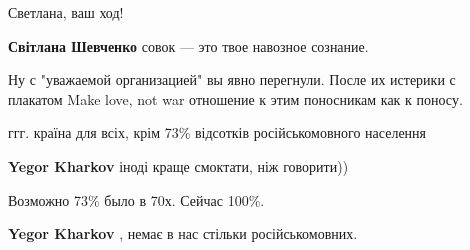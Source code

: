 \begin{itemize}
\begin{itemize}
Светлана, ваш ход!

 
\textbf{Світлана Шевченко} совок — это твое навозное сознание.
\end{itemize}

 
Ну с "уважаемой организацией" вы явно перегнули. После их истерики с плакатом
Make love, not war отношение к этим поносникам как к поносу.

 
ггг. країна для всіх, крім 73\% відсотків російськомовного населення

\begin{itemize}
 
\textbf{Yegor Kharkov} іноді краще смоктати, ніж говорити))

 
Возможно 73\% было в 70х. Сейчас 100\%.

 
\textbf{Yegor Kharkov} , немає в нас стільки російськомовних.
\end{itemize}


\end{itemize}
